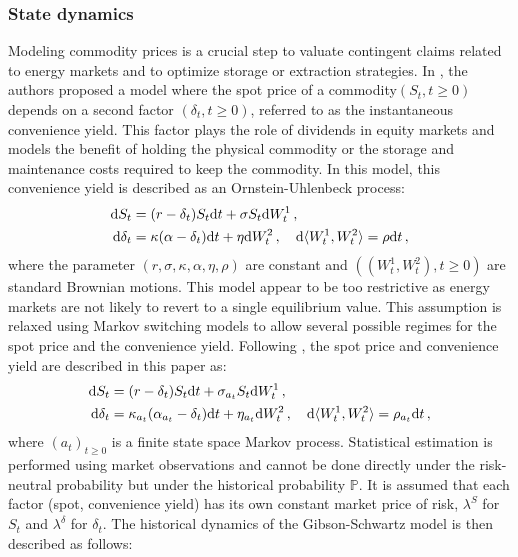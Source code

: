 \subsubsection*{State dynamics}
Modeling commodity prices is a crucial step to valuate contingent claims related to energy markets and to optimize storage or extraction strategies. In \cite{gibson:schwartz:1990,schwartz:1997}, the authors proposed a model where the spot price of a commodity$(S_t, t \geq 0)$ depends on a second factor $(\delta_t, t \geq 0)$, referred to as the instantaneous convenience yield. This factor plays the role of dividends in equity markets and models the benefit of holding the physical commodity or the storage and maintenance costs required to keep the commodity. In this model, this convenience yield is described as an Ornstein-Uhlenbeck process:
\begin{align*}
\mathrm{d} S_{t} & = (r-\delta_{t})S_{t}\mathrm{d} t+\sigma S_{t} \mathrm{d} W_{t}^{1} \,,\\
\mathrm{d} \delta_{t} & = \kappa(\alpha-\delta_{t})\mathrm{d} t+\eta \mathrm{d} W_{t}^{2} \,, \quad \mathrm{d} \langle W_t^1, W_t^2\rangle = \rho \mathrm{d} t\,,
\end{align*}
where the parameter $\left(r, \sigma, \kappa, \alpha, \eta, \rho \right)$ are constant and $( (W_t^1,W_t^2), t \geq 0)$ are standard Brownian motions. This model appear to be too restrictive as energy markets are not likely to revert to a single equilibrium value. This assumption is relaxed using Markov switching models to allow several possible regimes for the spot price and the convenience yield. Following \cite{almansour:2016}, the spot price and convenience yield are described in this paper as:
\begin{align*}
\mathrm{d} S_{t} & = (r-\delta_{t})S_{t}\mathrm{d} t+\sigma_{a_t} S_{t}\mathrm{d} W_{t}^{1} \,,\\
\mathrm{d}\delta_{t} & = \kappa_{a_t}(\alpha_{a_t} -\delta_{t})\mathrm{d} t+\eta_{a_t} \mathrm{d} W_{t}^{2} \,, \quad \mathrm{d}\langle W_t^1, W_t^2\rangle = \rho_{a_t} \mathrm{d} t\,,
\end{align*}
where $(a_t)_{t\ge 0}$ is a finite state space Markov process. 
Statistical estimation is performed using market observations and cannot be done directly under the risk-neutral probability but under the historical probability $\mathbb{P}$. It is assumed that each factor (spot, convenience yield) has its own constant market price of risk, $\lambda^S$ for $S_t$ and $\lambda^{\delta}$ for $\delta_t$. The historical dynamics of the Gibson-Schwartz model is then described as follows:
